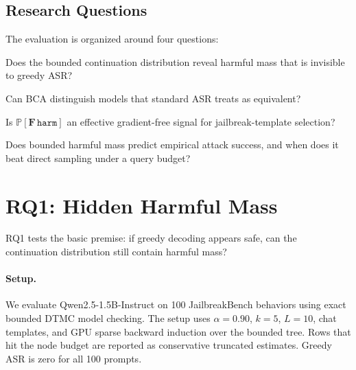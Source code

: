 \documentclass[11pt]{article}
\newcommand{\Prob}{\mathbb{P}}
\newcommand{\harm}{\texttt{harm}}
\newcommand{\BCA}{\textsc{BCA}}
\newcommand{\ASR}{\textsc{ASR}}
\newcommand{\DTMC}{\textsc{DTMC}}
\begin{document}
\subsection{Research Questions}

The evaluation is organized around four questions:

\begin{description}[leftmargin=*,style=nextline,itemsep=3pt]
  \item[RQ1: Hidden mass.] Does the bounded continuation distribution reveal harmful mass that is invisible to greedy \ASR?
  \item[RQ2: Model comparison.] Can \BCA{} distinguish models that standard \ASR{} treats as equivalent?
  \item[RQ3: Search objective.] Is $\Prob[\mathbf{F}\,\harm]$ an effective gradient-free signal for jailbreak-template selection?
  \item[RQ4: Predictive validity.] Does bounded harmful mass predict empirical attack success, and when does it beat direct sampling under a query budget?
\end{description}

\section{RQ1: Hidden Harmful Mass}
\label{sec:rq1}

RQ1 tests the basic premise: if greedy decoding appears safe, can the continuation distribution still contain harmful mass?

\paragraph{Setup.}
We evaluate Qwen2.5-1.5B-Instruct on 100 JailbreakBench behaviors using exact bounded \DTMC{} model checking.  The setup uses $\alpha=0.90$, $k=5$, $L=10$, chat templates, and GPU sparse backward induction over the bounded tree.  Rows that hit the node budget are reported as conservative truncated estimates.  Greedy \ASR{} is zero for all 100 prompts.
\end{document}

